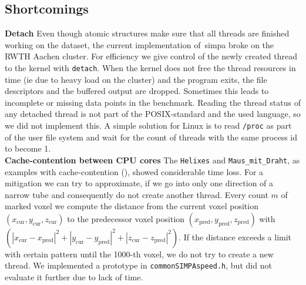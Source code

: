 \documentclass{article}
\begin{document}
\subsection{Shortcomings}\label{subsec:shortcomings}
\textbf{Detach}
Even though atomic structures make sure that all threads are finished working on the dataset,
the current implementation of~\ac{simpa} broke on the RWTH Aachen cluster.
For efficiency we give control of the newly created thread to the kernel with \texttt{detach}.
When the kernel does not free the thread resources in time (ie due to heavy load on the cluster) and the program exits, the file descriptors and the buffered output are dropped.
Sometimes this leads to incomplete or missing data points in the benchmark.
Reading the thread status of any detached thread is not part of the POSIX-standard and the used language, so we did not implement this.
A simple solution for Linux is to read \texttt{/proc} as part of the user file system and wait for the count of threads with the same process id to become 1.\\
\textbf{Cache-contention between CPU cores}
The \texttt{Helixes} and \texttt{Maus\_mit\_Draht}, as examples with cache-contention (), showed considerable time loss.
For a mitigation we can try to approximate, if we go into only one direction of a narrow tube and consequently do not create another thread.
Every count $m$ of marked voxel we compute the distance from the current voxel position $(x_\text{cur},y_\text{cur},z_\text{cur})$ to the predecessor voxel position $(x_\text{pred},y_\text{pred},z_\text{pred})$ with $(|x_\text{cur}-x_\text{pred}|^2 + |y_\text{cur}-y_\text{pred}|^2 + |z_\text{cur}-z_\text{pred}|^2)$.
If the distance exceeds a limit with certain pattern until the 1000-th voxel, we do not try to create a new thread.
We implemented a prototype in \texttt{commonSIMPAspeed.h}, but did not evaluate it further due to lack of time.
\end{document}
